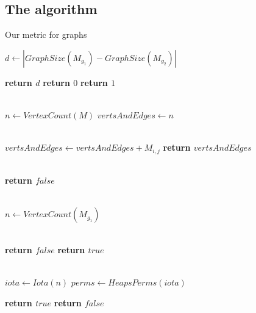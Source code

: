 \subsection{The algorithm}
\begin{algorithm}[H]
	\caption{Our metric for graphs}\label{alg:metric1}
	\begin{algorithmic}
			\State $d \gets |GraphSize(M_{g_1}) - GraphSize(M_{g_2})|$
			
			\State \textbf{return $d$}
			\State \textbf{return $0$}
			\Else
			\State \textbf{return $1$}
			\EndIf
		\EndProcedure
		
		\\
		
			\State $n \gets VertexCount(M)$
			\State $vertsAndEdges \gets n$
			
			\\
			
			\State $vertsAndEdges \gets vertsAndEdges + M_{i, j}$
			\EndFor
			\EndFor
			\State \textbf{return $vertsAndEdges$}
		\EndProcedure
		
		\\
		
				\State \textbf{return $false$}
			\EndIf
		
			\\
				
			\State $n \gets VertexCount(M_{g_1})$
			
			\\
			
							\State \textbf{return $false$}
						\EndIf
					\EndFor
				\EndFor
				\State \textbf{return $true$}
			\EndProcedure
			
			\\
			
			\State $iota \gets Iota(n)$ 
			\State $perms \gets HeapsPerms(iota)$
			
					\State \textbf{return $true$}
				\EndIf
			\EndFor
			\State \textbf{return $false$}
		\EndProcedure
		
	\end{algorithmic}
\end{algorithm}
